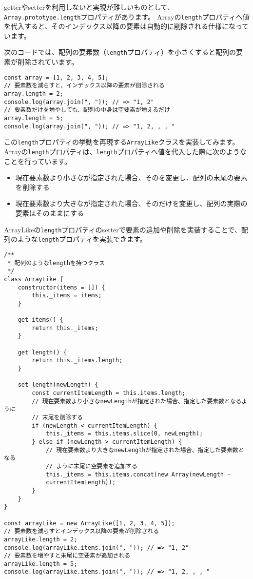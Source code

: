 getterやsetterを利用しないと実現が難しいものとして、\texttt{Array.prototype.length}プロパティがあります。
Arrayの\texttt{length}プロパティへ値を代入すると、そのインデックス以降の要素は自動的に削除される仕様になっています。

次のコードでは、配列の要素数（\texttt{length}プロパティ）を小さくすると配列の要素が削除されています。

\begin{lstlisting}
const array = [1, 2, 3, 4, 5];
// 要素数を減らすと、インデックス以降の要素が削除される
array.length = 2;
console.log(array.join(", ")); // => "1, 2"
// 要素数だけを増やしても、配列の中身は空要素が増えるだけ
array.length = 5;
console.log(array.join(", ")); // => "1, 2, , , "
\end{lstlisting}

この\texttt{length}プロパティの挙動を再現する\texttt{ArrayLike}クラスを実装してみます。
Arrayの\texttt{length}プロパティは、\texttt{length}プロパティへ値を代入した際に次のようなことを行っています。

\begin{itemize}
\item
  現在要素数より小さな\textbf{}が指定された場合、その\textbf{}を変更し、配列の末尾の要素を削除する
\item
  現在要素数より大きな\textbf{}が指定された場合、その\textbf{}だけを変更し、配列の実際の要素はそのままにする
\end{itemize}

ArrayLikeの\texttt{length}プロパティのsetterで要素の追加や削除を実装することで、配列のような\texttt{length}プロパティを実装できます。

\begin{lstlisting}
/**
 * 配列のようなlengthを持つクラス
 */
class ArrayLike {
    constructor(items = []) {
        this._items = items;
    }

    get items() {
        return this._items;
    }

    get length() {
        return this._items.length;
    }

    set length(newLength) {
        const currentItemLength = this.items.length;
        // 現在要素数より小さなnewLengthが指定された場合、指定した要素数となるように
        // 末尾を削除する
        if (newLength < currentItemLength) {
            this._items = this.items.slice(0, newLength);
        } else if (newLength > currentItemLength) {
            // 現在要素数より大きなnewLengthが指定された場合、指定した要素数となる
            // ように末尾に空要素を追加する
            this._items = this.items.concat(new Array(newLength - 
            currentItemLength));
        }
    }
}

const arrayLike = new ArrayLike([1, 2, 3, 4, 5]);
// 要素数を減らすとインデックス以降の要素が削除される
arrayLike.length = 2;
console.log(arrayLike.items.join(", ")); // => "1, 2"
// 要素数を増やすと末尾に空要素が追加される
arrayLike.length = 5;
console.log(arrayLike.items.join(", ")); // => "1, 2, , , "
\end{lstlisting}

